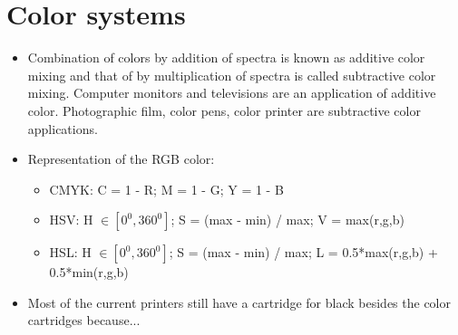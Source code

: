 \documentclass{article}
\begin{document}
\section{Color systems}
\begin{itemize}
	\item Combination of colors by addition of spectra is known as additive color mixing and that of by multiplication of spectra is called subtractive color mixing. Computer monitors and televisions are an application of additive color. Photographic film, color pens, color printer are subtractive color applications.
	\item Representation of the RGB color:
	\begin{itemize}
		\item CMYK: C = 1 - R; M = 1 - G; Y = 1 - B
		\item HSV: H $\in [ 0^0, 360^0]$; S = (max - min) / max; V = max(r,g,b)
		\item HSL: H $\in [ 0^0, 360^0]$; S = (max - min) / max; L = 0.5*max(r,g,b) + 0.5*min(r,g,b)
	\end{itemize}
	\item Most of the current printers still have a cartridge for black besides the color cartridges because...
\end{itemize}
\end{document}
